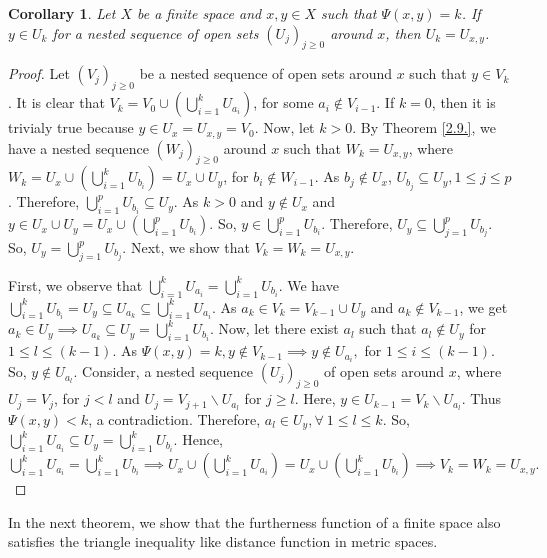 \documentclass[12pt]{amsart}
\newtheorem{corollary}[definition]{Corollary}
\begin{document}
\begin{corollary}
	Let $X$ be a finite space and $x,y\in X$ such that $\Psi(x,y)=k$. If $y\in U_k$ for a nested sequence of open sets $(U_j)_{j\geq 0}$ around $x$, then $U_k=U_{x,y}$.
\end{corollary}
\begin{proof}
	Let $(V_j)_{j\geq 0}$ be a nested sequence of open sets around $x$ such that $y\in V_k$. It is clear that $V_{k}= V_0\cup (\bigcup\limits_{i=1}^{k} U_{a_i})$, for some $a_i\notin V_{i-1}$. If $k=0$, then it is trivialy true because $y\in U_x=U_{x,y}=V_0$. Now, let $k>0$. By Theorem \ref{2.9.}, we have a nested sequence $(W_j)_{j\geq 0}$ around $x$ such that $W_k=U_{x,y}$, where  $W_k= U_x\cup (\bigcup\limits_{i=1}^k U_{b_i})=U_x\cup U_y$, for $b_i \notin W_{i-1}$. As $b_j\notin U_x$, $U_{b_j}\subseteq U_y,  1\leq j\leq p$. Therefore, $\bigcup\limits_{i=1}^p U_{b_i}\subseteq U_y$. As $k>0$ and $y\notin U_x$ and $y\in U_x\cup U_y =  U_x\cup (\bigcup\limits_{i=1}^p U_{b_i})$. So, $y\in \bigcup\limits_{i=1}^p U_{b_i}$. Therefore, $U_y\subseteq\bigcup\limits_{j=1}^p U_{b_j}$. So, $U_y=\bigcup\limits_{j=1}^p U_{b_j}$. Next, we show that $V_k=W_k=U_{x,y}$.\par 
	First, we observe that $\bigcup\limits_{i=1}^{k} U_{a_i}= \bigcup\limits_{i=1}^k U_{b_i}.$ We have  $\bigcup\limits_{i=1}^k U_{b_i}=U_y\subseteq U_{a_k}\subseteq \bigcup\limits_{i=1}^{k} U_{a_i}.$  As $a_k\in V_k=V_{k-1}\cup U_y$ and $a_k\notin V_{k-1}$,  we get $a_k\in U_y\implies U_{a_k}\subseteq U_y = \bigcup\limits_{i=1}^k U_{b_i}.$ Now, let there exist  $a_l$ such that $a_l\notin U_y$ for $1\leq l\leq (k-1).$ As $\Psi(x,y)=k, y\notin V_{k-1} \implies y\notin U_{a_i},$ for $1\leq i\leq (k-1)$. So, $y\notin U_{a_l}$. Consider, a nested sequence $(U_j)_{j\geq 0}$ of open sets around $x$, where $U_j =V_j$, for $j< l$ and $U_j= V_{j+1}\backslash U_{a_l}$ for $ j\geq l$. Here, $ y\in U_{k-1}= V_k\backslash U_{a_l}$. Thus $\Psi(x,y)<k$, a contradiction. Therefore, $a_l\in U_y, \forall~ 1\leq l\leq k$. So, $\bigcup\limits_{i=1}^{k} U_{a_i}\subseteq U_y= \bigcup\limits_{i=1}^k U_{b_i}.$ 
	Hence, $\bigcup\limits_{i=1}^{k} U_{a_i} = \bigcup\limits_{i=1}^{k} U_{b_i}\implies U_x\cup (\bigcup\limits_{i=1}^{k} U_{a_i} )= U_x\cup(\bigcup\limits_{i=1}^{k} U_{b_i}) \implies V_k=W_k=U_{x,y}.$
\end{proof}


In the next theorem, we show that the furtherness function of a finite  space also satisfies the triangle inequality like distance function in metric spaces.
\end{document}
